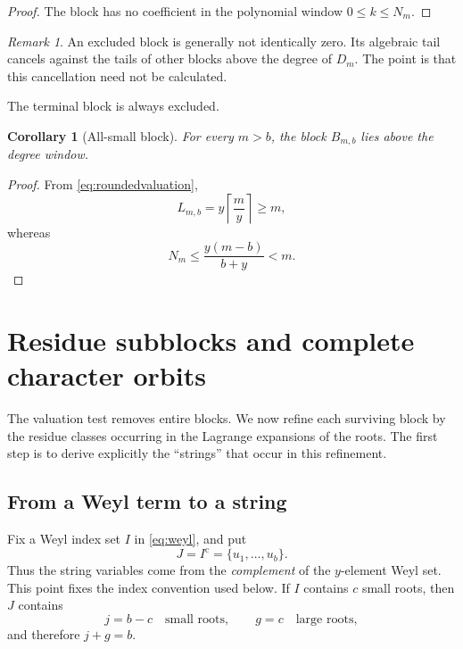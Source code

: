 \documentclass[11pt]{amsart}
\newtheorem{corollary}[theorem]{Corollary}
\theoremstyle{remark}
\newtheorem{remark}[theorem]{Remark}
\begin{document}
\begin{proof}
The block has no coefficient in the polynomial window $0\leq k\leq N_m$.
\end{proof}

\begin{remark}
An excluded block is generally not identically zero.  Its algebraic tail cancels against the tails of other blocks above the degree of $D_m$.  The point is that this cancellation need not be calculated.
\end{remark}

The terminal block is always excluded.

\begin{corollary}[All-small block]\label{cor:allsmall}
For every $m>b$, the block $B_{m,b}$ lies above the degree window.
\end{corollary}

\begin{proof}
From \eqref{eq:roundedvaluation},
\[
    L_{m,b}=y\left\lceil\frac{m}{y}\right\rceil\geq m,
\]
whereas
\[
    N_m\leq\frac{y(m-b)}{b+y}<m.
\]
\end{proof}

\section{Residue subblocks and complete character orbits}\label{sec:residues}

The valuation test removes entire blocks.  We now refine each surviving block by the residue classes occurring in the Lagrange expansions of the roots.  The first step is to derive explicitly the ``strings'' that occur in this refinement.

\subsection{From a Weyl term to a string}\label{subsec:strings}

Fix a Weyl index set $I$ in \eqref{eq:weyl}, and put
\[
    J=I^{\mathrm c}=\{u_1,\ldots,u_b\}.
\]
Thus the string variables come from the \emph{complement} of the $y$-element Weyl set.  This point fixes the index convention used below.  If $I$ contains $c$ small roots, then $J$ contains
\begin{equation}\label{eq:jgfromc}
    j=b-c\quad\text{small roots},
    \qquad
    g=c\quad\text{large roots},
\end{equation}
and therefore $j+g=b$.
\end{document}
